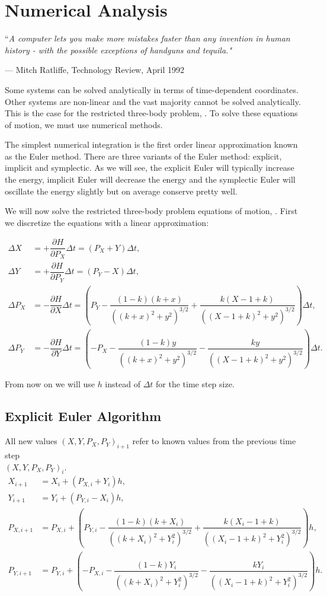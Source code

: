 \chapter{Numerical Analysis} \label{ch:numerical-analysis}
\epigraph{``\itshape{A computer lets you make more mistakes faster than any invention in human history - with the possible exceptions of handguns and tequila.}"}{--- \textup{Mitch Ratliffe}, Technology Review, April 1992}

Some systems can be solved analytically in terms of time-dependent coordinates. Other systems are non-linear and the vast majority cannot be solved analytically. This is the case for the restricted three-body problem, . To solve these equations of motion, we must use numerical methods.

The simplest numerical integration is the first order linear approximation known as the Euler method. There are three variants of the Euler method: explicit, implicit and symplectic. As we will see, the explicit Euler will typically increase the energy, implicit Euler will decrease the energy and the symplectic Euler will oscillate the energy slightly but on average conserve pretty well.

We will now solve the restricted three-body problem equations of motion, . First we discretize the equations with a linear approximation:

\begin{align}
\Delta X &= +\dfrac{\partial H}{\partial P_X}\Delta t = (P_X + Y)\Delta t, \\[0.2cm]
\Delta Y &= +\dfrac{\partial H}{\partial P_Y}\Delta t = (P_Y - X)\Delta t, \\[0.2cm]
\Delta P_X &= -\dfrac{\partial H}{\partial X}\Delta t = \left(P_Y - \dfrac{(1-k)(k+x)}{((k+x)^2+y^2)^{3/2}} + \dfrac{k(X-1+k)}{((X-1+k)^2+y^2)^{3/2}}\right)\Delta t, \\[0.2cm]
\Delta P_Y &= -\dfrac{\partial H}{\partial Y}\Delta t = \left(-P_X - \dfrac{(1-k)y}{((k+x)^2+y^2)^{3/2}} - \dfrac{k y}{((X-1+k)^2+y^2)^{3/2}}\right)\Delta t.
\end{align}

From now on we will use $h$ instead of $\Delta t$ for the time step size.

\section{Explicit Euler Algorithm}
All new values $(X,Y,P_X,P_Y)_{i+1}$ refer to known values from the previous time step \\ $(X,Y,P_X,P_Y)_i$.
\begin{align}
X_{i+1} &= X_i + (P_{X,i} + Y_i)h, \\[0.2cm]
Y_{i+1} &= Y_i + (P_{Y,i} - X_i)h , \\[0.2cm]
P_{X,i+1} &= P_{X,i} + \left(P_{Y,i} - \dfrac{(1-k)(k+X_i)}{((k+X_i)^2+Y_i^2)^{3/2}} + \dfrac{k(X_i-1+k)}{((X_i-1+k)^2+Y_i^2)^{3/2}}\right)h, \\[0.2cm]
P_{Y,i+1} &= P_{Y,i} + \left(-P_{X,i} - \dfrac{(1-k)Y_i}{((k+X_i)^2+Y_i^2)^{3/2}} - \dfrac{k Y_i}{((X_i-1+k)^2+Y_i^2)^{3/2}}\right)h.
\end{align}


